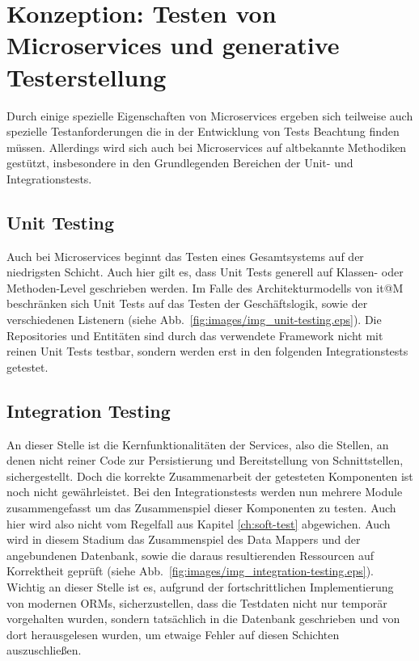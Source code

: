 \documentclass[12pt,a4paper,bibliography=totocnumbered,listof=totocnumbered]{scrartcl}
\begin{document}
\section{Konzeption: Testen von Microservices und generative Testerstellung}\label{ch:ms-test}
\label{sec:testingms}

Durch einige spezielle Eigenschaften von Microservices ergeben sich teilweise auch spezielle Testanforderungen die in der Entwicklung von Tests Beachtung finden müssen. Allerdings wird sich auch bei Microservices auf altbekannte Methodiken gestützt, insbesondere in den Grundlegenden Bereichen der Unit- und Integrationstests.

\subsection{Unit Testing}

Auch bei Microservices beginnt das Testen eines Gesamtsystems auf der niedrigsten Schicht. Auch hier gilt es, dass Unit Tests generell auf Klassen- oder Methoden-Level geschrieben werden.\cite{clemson} Im Falle des Architekturmodells von it@M beschränken sich Unit Tests auf das Testen der Geschäftslogik, sowie der verschiedenen Listenern (siehe Abb.~\ref{fig:images/img_unit-testing.eps}). Die Repositories und Entitäten sind durch das verwendete Framework nicht mit reinen Unit Tests testbar, sondern werden erst in den folgenden Integrationstests getestet.


\subsection{Integration Testing}

An dieser Stelle ist die Kernfunktionalitäten der Services, also die Stellen, an denen nicht reiner Code zur Persistierung und Bereitstellung von Schnittstellen, sichergestellt. Doch die korrekte Zusammenarbeit der getesteten Komponenten ist noch nicht gewährleistet. Bei den Integrationstests werden nun mehrere Module zusammengefasst um das Zusammenspiel dieser Komponenten zu testen.\cite{clemson} Auch hier wird also nicht vom Regelfall aus Kapitel \ref{ch:soft-test} abgewichen. Auch wird in diesem Stadium das Zusammenspiel des Data Mappers und der angebundenen Datenbank, sowie die daraus resultierenden Ressourcen auf Korrektheit geprüft (siehe Abb.~\ref{fig:images/img_integration-testing.eps}). Wichtig an dieser Stelle ist es, aufgrund der fortschrittlichen Implementierung von modernen \acp{ORM}, sicherzustellen, dass die Testdaten nicht nur temporär vorgehalten wurden, sondern tatsächlich in die Datenbank geschrieben und von dort herausgelesen wurden, um etwaige Fehler auf diesen Schichten auszuschließen.\cite{clemson}
\end{document}
